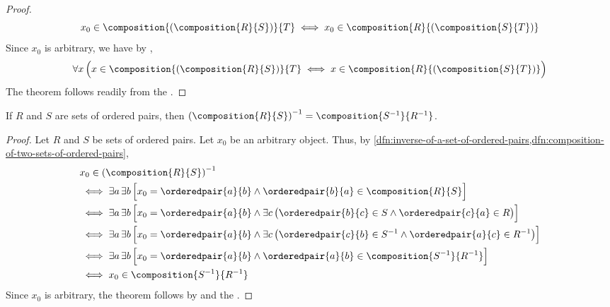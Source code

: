 \begin{proof}
    \begin{equation*}
        x_{0} \in \composition{ \mleft( \composition{R}{S} \mright) }{T} \iff x_{0} \in \composition{R}{\mleft( \composition{S}{T} \mright)}
    \end{equation*}
    Since \( x_{0} \) is arbitrary, we have by ,
    \begin{equation*}
        \forall x \, \Big( x \in \composition{\mleft( \composition{R}{S} \mright)}{T} \iff x \in \composition{R}{\mleft( \composition{S}{T} \mright)} \Big)
    \end{equation*}
    The theorem follows readily from the .
\end{proof}

\begin{thm}
    \label{thm:inverse-of-composition}
    If \( R \) and \( S \) are sets of ordered pairs, then \( \mleft( \composition{R}{S} \mright)^{-1} = \composition{S^{-1}}{R^{-1}} \).
\end{thm}

\begin{proof}
    Let \( R \) and \( S \) be sets of ordered pairs.
    Let \( x_{0} \) be an arbitrary object. Thus, by \cref{dfn:inverse-of-a-set-of-ordered-pairs,dfn:composition-of-two-sets-of-ordered-pairs},
    \begin{align*}
        &x_{0} \in \mleft( \composition{R}{S} \mright)^{-1} \\
        &\iff
        \exists a \, \exists b \, \Big[ x_{0} = \orderedpair{a}{b} \land \orderedpair{b}{a} \in \composition{R}{S} \Big] \\
        &\iff
        \exists a \, \exists b \, \Big[ x_{0} = \orderedpair{a}{b} \land
        \exists c \, \big( \orderedpair{b}{c} \in S \land \orderedpair{c}{a} \in R \big) \Big] \\
        &\iff
        \exists a \, \exists b \, \Big[ x_{0} = \orderedpair{a}{b} \land
        \exists c \, \big( \orderedpair{c}{b} \in S^{-1} \land \orderedpair{a}{c} \in R^{-1} \big)\Big] \\
        &\iff
        \exists a \, \exists b \, \Big[ x_{0} = \orderedpair{a}{b} \land \orderedpair{a}{b} \in \composition{S^{-1}}{R^{-1}} \Big]\\
        &\iff
        x_{0} \in \composition{S^{-1}}{R^{-1}}
    \end{align*}
    Since \( x_{0} \) is arbitrary, the theorem follows by 
    and the .
\end{proof}

